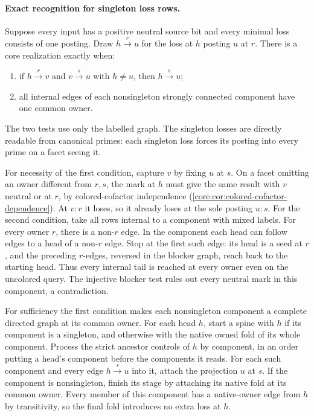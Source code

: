 \paragraph{Exact recognition for singleton loss rows.}
Suppose every input has a positive neutral source bit
and every minimal loss consists of one posting. Draw
$h\xrightarrow{r}u$ for the loss at $h$ posting $u$
at $r$. There is a core realization exactly when:
\begin{enumerate}
\item if $h\xrightarrow{r}v$ and $v\xrightarrow{s}u$
with $h\ne u$, then $h\xrightarrow{s}u$;
\item all internal edges of each nonsingleton strongly
connected component have one common owner.
\end{enumerate}
The two tests use only the labelled graph. The
singleton losses are directly readable from
canonical primes: each singleton loss forces its
posting into every prime on a facet seeing it.

For necessity of the first condition, capture $v$
by fixing $u$ at $s$. On a facet omitting an owner
different from $r,s$, the mark at $h$ must give
the same result with $v$ neutral or at $r$, by
colored-cofactor independence
(\cref{core:cor:colored-cofactor-dependence}).
At $v{:}r$ it loses, so it already loses at the
sole posting $u{:}s$. For the second condition,
take all rows internal to a component with
mixed labels. For every owner $r$, there is a
non-$r$ edge. In the component each head can
follow edges to a head of a non-$r$ edge.
Stop at the first such edge: its head is a seed
at $r$, and the preceding $r$-edges, reversed in
the blocker graph, reach back to the starting
head. Thus every internal tail is reached at
every owner even on the uncolored query.
The injective blocker test rules out every
neutral mark in this component, a contradiction.

For sufficiency the first condition makes each
nonsingleton component a complete directed graph
at its common owner. For each head $h$, start
a spine with $h$ if its component is a singleton,
and otherwise with the native owned fold of
its whole component. Process the strict
ancestor controls of $h$ by component, in
an order putting a head's component before
the components it reads. For each such
component and every edge $h\xrightarrow{s}u$
into it, attach the projection $u$ at $s$.
If the component is nonsingleton, finish
its stage by attaching its native fold at
its common owner. Every member of this
component has a native-owner edge from $h$
by transitivity, so the final fold introduces
no extra loss at $h$.

